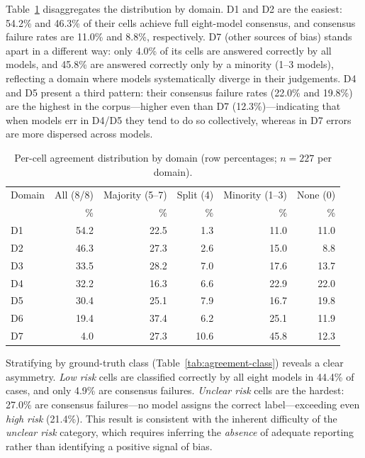 \documentclass[../main.tex]{subfiles}
\begin{document}
Table~\ref{tab:agreement-domain} disaggregates the distribution by domain.
D1 and D2 are the easiest: 54.2\% and 46.3\% of their cells achieve full
eight-model consensus, and consensus failure rates are 11.0\% and 8.8\%,
respectively.
D7 (other sources of bias) stands apart in a different way: only 4.0\% of its
cells are answered correctly by all models, and 45.8\% are answered correctly
only by a minority (1--3 models), reflecting a domain where models
systematically diverge in their judgements.
D4 and D5 present a third pattern: their consensus failure rates (22.0\% and
19.8\%) are the highest in the corpus---higher even than D7 (12.3\%)---indicating
that when models err in D4/D5 they tend to do so collectively, whereas in D7
errors are more dispersed across models.

\begin{table}[H]
\centering
\caption{Per-cell agreement distribution by domain (row percentages; $n = 227$
  per domain).}
\label{tab:agreement-domain}
\begin{tabular}{lrrrrr}
\toprule
Domain & All (8/8) & Majority (5--7) & Split (4) & Minority (1--3) & None (0) \\
       & \%        & \%              & \%        & \%              & \%       \\
\midrule
D1 & 54.2 & 22.5 &  1.3 & 11.0 & 11.0 \\
D2 & 46.3 & 27.3 &  2.6 & 15.0 &  8.8 \\
D3 & 33.5 & 28.2 &  7.0 & 17.6 & 13.7 \\
D4 & 32.2 & 16.3 &  6.6 & 22.9 & 22.0 \\
D5 & 30.4 & 25.1 &  7.9 & 16.7 & 19.8 \\
D6 & 19.4 & 37.4 &  6.2 & 25.1 & 11.9 \\
D7 &  4.0 & 27.3 & 10.6 & 45.8 & 12.3 \\
\bottomrule
\end{tabular}
\end{table}

Stratifying by ground-truth class (Table~\ref{tab:agreement-class}) reveals a
clear asymmetry.
\emph{Low risk} cells are classified correctly by all eight models in 44.4\%
of cases, and only 4.9\% are consensus failures.
\emph{Unclear risk} cells are the hardest: 27.0\% are consensus failures---no
model assigns the correct label---exceeding even \emph{high risk} (21.4\%).
This result is consistent with the inherent difficulty of the \emph{unclear risk}
category, which requires inferring the \emph{absence} of adequate reporting rather
than identifying a positive signal of bias.
\end{document}
